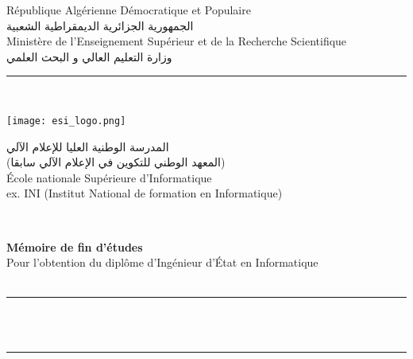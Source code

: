 \begin{titlepage}
    \centering
    {\small République Algérienne Démocratique et Populaire}\\
    {\small الجمهورية الجزائرية الديمقراطية الشعبية}\\
    {\small Ministère de l'Enseignement Supérieur et de la Recherche Scientifique}\\
    {\small وزارة التعليم العالي و البحث العلمي}\\
    \rule{\linewidth}{0.3mm} \\[0.4cm]

    \begin{minipage}{5cm}
        \begin{center}
            \texttt{[image: esi\_logo.png]}
        \end{center}
    \end{minipage}\hfill
    \begin{minipage}{10cm}
        \begin{flushright}
            {\small المدرسة الوطنية العليا للإعلام الآلي}\\
            {\small (المعهد الوطني للتكوين في الإعلام الآلي سابقا)}\\
            {\small École nationale Supérieure d'Informatique}\\[0.1cm]
            {\small ex. INI (Institut National de formation en Informatique)}\\[0.1cm]
        \end{flushright}
    \end{minipage}\hfill\\
    \vspace{20mm}

    {\large \bfseries Mémoire de fin d'études}\\[0.5cm]
    {\large Pour l'obtention du diplôme d'Ingénieur d'État en Informatique}\\[0.5cm]
    {\large \bfseries \documentOption \\ }
    \vspace{10mm}

    \rule{\linewidth}{0.3mm} \\[0.4cm]
    { \huge \bfseries \documentTitle\\[0.4cm] }
    \rule{\linewidth}{0.3mm} \\[1cm]
    \vspace{10mm}


\end{titlepage}
